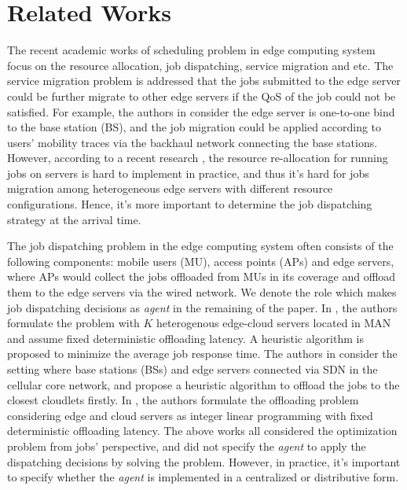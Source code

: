 \section{Related Works}
\label{sec:review}
The recent academic works of scheduling problem in edge computing system focus on the resource allocation, job dispatching, service migration and etc.
The service migration problem is addressed that the jobs submitted to the edge server could be further migrate to other edge servers if the QoS of the job could not be satisfied.
For example, the authors in \cite{TON19-WangSq} consider the edge server is one-to-one bind to the base station (BS), and the job migration could be applied according to users' mobility traces via the backhaul network connecting the base stations.
However, according to a recent research \cite{INFOCOM19-WuC}, the resource re-allocation for running jobs on servers is hard to implement in practice, and thus it's hard for jobs migration among heterogeneous edge servers with different resource configurations.
Hence, it's more important to determine the job dispatching strategy at the arrival time.

The job dispatching problem in the edge computing system often consists of the following components: mobile users (MU), access points (APs) and edge servers, where APs would collect the jobs offloaded from MUs in its coverage and offload them to the edge servers via the wired network.
We denote the role which makes job dispatching decisions as \emph{agent} in the remaining of the paper.
In \cite{tan-online}, the authors formulate the problem with $K$ heterogenous edge-cloud servers located in MAN and assume fixed deterministic offloading latency.
A heuristic algorithm is proposed to minimize the average job response time.
The authors in \cite{IOTJ18-FanQ} consider the setting where base stations (BSs) and edge servers connected via SDN in the cellular core network, and propose a heuristic algorithm to offload the jobs to the closest cloudlets firstly.
In \cite{MASS18-MengZ}, the authors formulate the offloading problem considering edge and cloud servers as integer linear programming with fixed deterministic offloading latency.
The above works all considered the optimization problem from jobs' perspective, and did not specify the \emph{agent} to apply the dispatching decisions by solving the problem.
However, in practice, it's important to specify whether the \emph{agent} is implemented in a centralized or distributive form.

